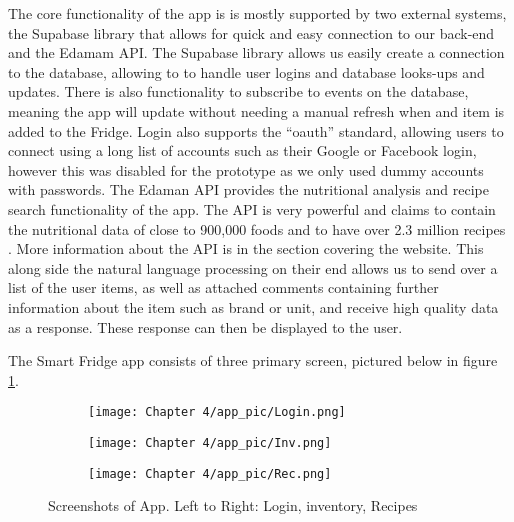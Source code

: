 The core functionality of the app is is mostly supported by two external systems, the Supabase library that allows for quick and easy connection to our back-end and the Edamam API.
The Supabase library allows us easily create a connection to the database, allowing to to handle user logins and database looks-ups and updates.
There is also functionality to subscribe to events on the database, meaning the app will update without needing a manual refresh when and item is added to the Fridge.
Login also supports the “oauth” standard, allowing users to connect using a long list of accounts such as their Google or Facebook login, however this was disabled for the prototype as we only used dummy accounts with passwords.
The Edaman API provides the nutritional analysis and recipe search functionality of the app.
The API is very powerful and claims to contain the nutritional data of close to 900,000 foods and to have over 2.3 million recipes \cite{edman}.
More information about the API is in the section covering the website.
This along side the natural language processing on their end allows us to send over a list of the user items, as well as attached comments containing further information about the item such as brand or unit, and receive high quality data as a response.
These response can then be displayed to the user.

The Smart Fridge app consists of three primary screen, pictured below in figure \ref{fig:app}.

\begin{figure}[H]
    \begin{subfigure}{.33\textwidth}
      \centering
      \texttt{[image: Chapter 4/app\_pic/Login.png]}
    \end{subfigure}%
    \begin{subfigure}{.33\textwidth}
      \centering
      \texttt{[image: Chapter 4/app\_pic/Inv.png]}
    \end{subfigure}
    \begin{subfigure}{.33\textwidth}
        \centering
        \texttt{[image: Chapter 4/app\_pic/Rec.png]}
    \end{subfigure}
    \caption{Screenshots of App.
Left to Right: Login, inventory, Recipes}
    \label{fig:app}
\end{figure}

